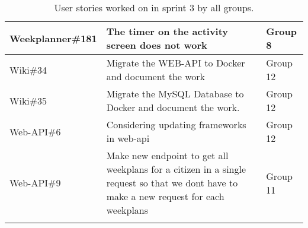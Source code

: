 \begin{longtable}{|p{2.8cm}|p{8cm}|p{2cm}|}
    Weekplanner\#181 & The timer on the activity screen does not work                                                                                                                                         & Group 8           \\ \hline
    Wiki\#34         & Migrate the WEB-API to Docker and document the work                                                                                                                                     & Group 12           \\ \hline
    Wiki\#35         & Migrate the MySQL Database to Docker and document the work.                                                                                                                            & Group 12           \\ \hline
    Web-API\#6      & Considering updating frameworks in web-api                                                                                                                                            & Group 12       \\ \hline
    Web-API\#9      & Make new endpoint to get all weekplans for a citizen in a single request so that we dont have to make a new request for each weekplans                                                & Group 11           \\ \hline
    \caption{User stories worked on in sprint 3 by all groups.}\label{table:user-stories-sprint-3}
\end{longtable}

